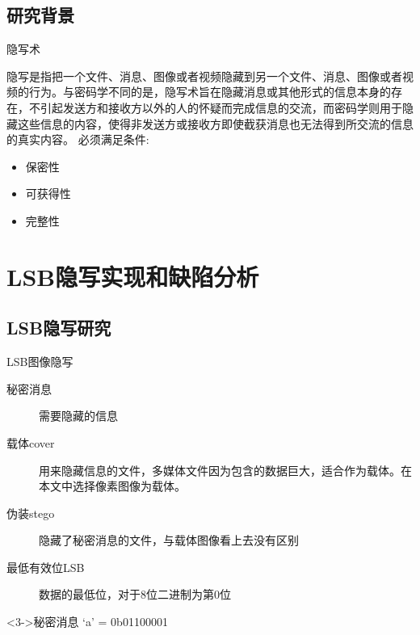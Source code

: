 \documentclass[14pt]{Bredelebeamer}
\begin{document}
\subsection{研究背景}
\begin{frame}{隐写术}

{\large
隐写是指把一个文件、消息、图像或者视频隐藏到另一个文件、消息、图像或者视频的行为。与密码学不同的是，隐写术旨在隐藏消息或其他形式的信息本身的\alert{存在}，不引起发送方和接收方以外的人的怀疑而完成信息的交流，而密码学则用于隐藏这些信息的\alert{内容}，使得非发送方或接收方即使截获消息也无法得到所交流的信息的真实内容。
必须满足条件:
\pause
\begin{itemize}
  \item	保密性
  \item 可获得性
  \item 完整性
\end{itemize}
}
\end{frame}

\section{LSB隐写实现和缺陷分析}
\subsection{LSB隐写研究}
\begin{frame}{LSB图像隐写}
\begin{description}
  \item[秘密消息] 需要隐藏的信息
  \item[载体cover] 用来隐藏信息的文件，多媒体文件因为包含的数据巨大，适合作为载体。在本文中选择像素图像为载体。
  \item[伪装stego] 隐藏了秘密消息的文件，与载体图像看上去没有区别
  \item[最低有效位LSB] 数据的最低位，对于8位二进制为第0位 
\end{description}
\begin{alertblock}<3->{秘密消息}
  `a' = 0b\textcolor<4>{alertTitleBlockColor}{01100001}
\end{alertblock}

\pause



\end{frame}
\end{document}
